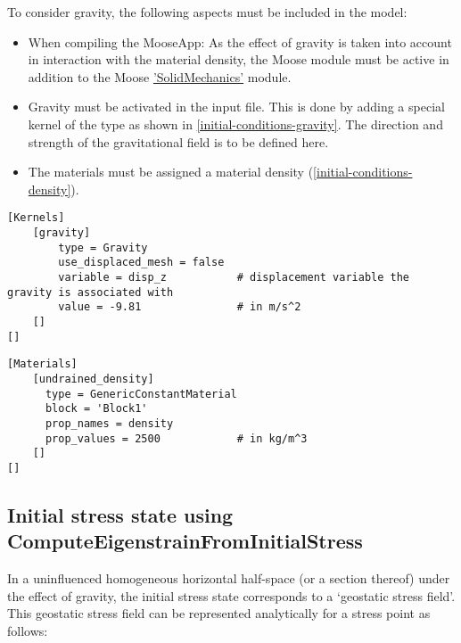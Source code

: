 To consider gravity, the following aspects must be included in the model:
\begin{itemize}
  \item When compiling the MooseApp: As the effect of gravity is taken into account in
        interaction with the material density, the Moose module  must be
        active in addition to the Moose
        \href{https://mooseframework.inl.gov/modules/solid_mechanics/}{'SolidMechanics'}
        module.
  \item Gravity must be activated in the input file. This is done by adding a special
        kernel of the type  as shown in
        \autoref{initial-conditions-gravity}. The direction and strength of the
        gravitational field is to be defined here.
  \item The materials must be assigned a material density
        (\autoref{initial-conditions-density}).
\end{itemize}

\begin{lstlisting}[language=Moose, float, caption={Gravity kernel in a Moose inut file},label={initial-conditions-gravity}]
[Kernels]
    [gravity]
        type = Gravity
        use_displaced_mesh = false
        variable = disp_z           # displacement variable the gravity is associated with
        value = -9.81               # in m/s^2
    []
[]
\end{lstlisting}

\begin{lstlisting}[language=Moose, float, caption={Assignment of a density to subdomain ‘block1’},label={initial-conditions-density}]
[Materials]
    [undrained_density]
      type = GenericConstantMaterial
      block = 'Block1'
      prop_names = density
      prop_values = 2500            # in kg/m^3
    []
[]
\end{lstlisting}

{\hfuzz=20pt
\subsection{Initial stress state using ComputeEigenstrainFromInitialStress}
}
\label{chap:IC-stress-state-simple}

In a uninfluenced homogeneous horizontal half-space (or a section thereof)
under the effect of gravity, the initial stress state corresponds to a
‘geostatic stress field’. This geostatic stress field can be represented
analytically for a stress point as follows:


